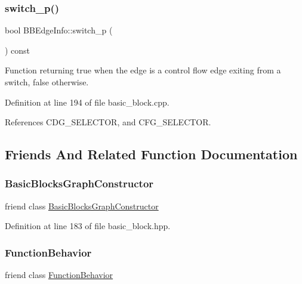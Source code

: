 \subsubsection{\texorpdfstring{switch\+\_\+p()}{switch\_p()}}
{\footnotesize\ttfamily bool B\+B\+Edge\+Info\+::switch\+\_\+p (\begin{DoxyParamCaption}{ }\end{DoxyParamCaption}) const}



Function returning true when the edge is a control flow edge exiting from a switch, false otherwise. 



Definition at line 194 of file basic\+\_\+block.\+cpp.



References C\+D\+G\+\_\+\+S\+E\+L\+E\+C\+T\+OR, and C\+F\+G\+\_\+\+S\+E\+L\+E\+C\+T\+OR.



\subsection{Friends And Related Function Documentation}
\mbox{\label{structBBEdgeInfo_a2ec16ee525628d633fa2b269c262b5af}} 
\subsubsection{\texorpdfstring{Basic\+Blocks\+Graph\+Constructor}{BasicBlocksGraphConstructor}}
{\footnotesize\ttfamily friend class \hyperlink{classBasicBlocksGraphConstructor}{Basic\+Blocks\+Graph\+Constructor}\hspace{0.3cm}{\ttfamily [friend]}}



Definition at line 183 of file basic\+\_\+block.\+hpp.

\mbox{\label{structBBEdgeInfo_af6a92c6b34ca1e8f6cd6c5a95a1f7710}} 
\subsubsection{\texorpdfstring{Function\+Behavior}{FunctionBehavior}}
{\footnotesize\ttfamily friend class \hyperlink{classFunctionBehavior}{Function\+Behavior}\hspace{0.3cm}{\ttfamily [friend]}}



